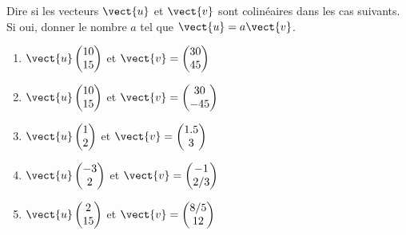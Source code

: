 
\begin{exercice}\label{exosmath-0705}

    Dire si les vecteurs \( \vect{ u }\) et \( \vect{ v }\) sont colinéaires dans les cas suivants. Si oui, donner le nombre \( a\) tel que \( \vect{ u }=a\vect{ v }\).
    \begin{enumerate}
        \item
            \( \vect{ u }\begin{pmatrix}
                10    \\ 
                15    
            \end{pmatrix}\) et \( \vect{ v }=\begin{pmatrix}
                30   \\ 
                45    
            \end{pmatrix}\)
        \item
            \( \vect{ u }\begin{pmatrix}
                10    \\ 
                15    
            \end{pmatrix}\) et \( \vect{ v }=\begin{pmatrix}
                30   \\ 
                -45    
            \end{pmatrix}\)
        \item
            \( \vect{ u }\begin{pmatrix}
                1    \\ 
                2    
            \end{pmatrix}\) et \( \vect{ v }=\begin{pmatrix}
                1.5    \\ 
                3    
            \end{pmatrix}\)
        \item
            \( \vect{ u }\begin{pmatrix}
                -3    \\ 
                2    
            \end{pmatrix}\) et \( \vect{ v }=\begin{pmatrix}
                -1   \\ 
                2/3    
            \end{pmatrix}\)
        \item
            \( \vect{ u }\begin{pmatrix}
                2    \\ 
                15    
            \end{pmatrix}\) et \( \vect{ v }=\begin{pmatrix}
                8/5   \\ 
                  12  
            \end{pmatrix}\)
    \end{enumerate}
    

\end{exercice}

